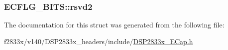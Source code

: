 \subsubsection[{rsvd2}]{ E\+C\+F\+L\+G\+\_\+\+B\+I\+T\+S\+::rsvd2}\label{struct_e_c_f_l_g___b_i_t_s_a37e13d634434a5accdf84ff95b5acc6e}


The documentation for this struct was generated from the following file\+:\begin{DoxyCompactItemize}
\item 
f2833x/v140/\+D\+S\+P2833x\+\_\+headers/include/\hyperlink{_d_s_p2833x___e_cap_8h}{D\+S\+P2833x\+\_\+\+E\+Cap.\+h}\end{DoxyCompactItemize}
